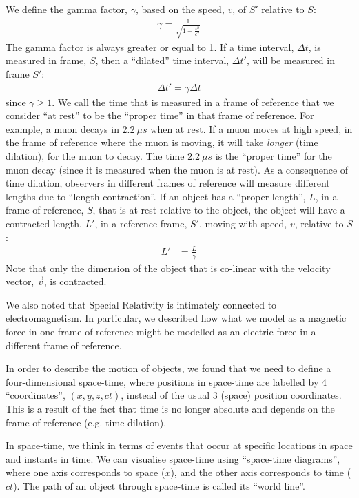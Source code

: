 \begin{chapterSummary}
We define the gamma factor, $\gamma$, based on the speed, $v$, of $S'$ relative to $S$:
\begin{align*}
\gamma = \frac{1}{\sqrt{1-\frac{v^2}{c^2}}}
\end{align*}
The gamma factor is always greater or equal to 1. If a time interval, $\Delta t$, is measured in frame, $S$, then a ``dilated'' time interval, $\Delta t'$, will be measured in frame $S'$:
\begin{align*}
\Delta t'=\gamma \Delta t
\end{align*}
since $\gamma \geq 1$. We call the time that is measured in a frame of reference that we consider ``at rest'' to be the ``proper time'' in that frame of reference. For example, a muon decays in $\SI{2.2}{\mu s}$ when at rest. If a muon moves at high speed, in the frame of reference where the muon is moving, it will take \textit{longer} (time dilation), for the muon to decay. The time $\SI{2.2}{\mu s}$ is the ``proper time'' for the muon decay (since it is measured when the muon is at rest). As a consequence of time dilation, observers in different frames of reference will measure different lengths due to ``length contraction''. If an object has a ``proper length'', $L$, in a frame of reference, $S$, that is at rest relative to the object, the object will have a contracted length, $L'$, in a reference frame, $S'$, moving with speed, $v$, relative to $S$:
\begin{align*}
L'&=\frac{L}{\gamma}
\end{align*} 
Note that only the dimension of the object that is co-linear with the velocity vector, $\vec v$, is contracted. 

We also noted that Special Relativity is intimately connected to electromagnetism. In particular, we described how what we model as a magnetic force in one frame of reference might be modelled as an electric force in a different frame of reference.

In order to describe the motion of objects, we found that we need to define a four-dimensional space-time, where positions in space-time are labelled by 4 ``coordinates'', $(x,y,z,ct)$, instead of the usual 3 (space) position coordinates. This is a result of the fact that time is no longer absolute and depends on the frame of reference (e.g. time dilation). 

In space-time, we think in terms of events that occur at specific locations in space and instants in time. We can visualise space-time using ``space-time diagrams'', where one axis corresponds to space ($x$), and the other axis corresponds to time ($ct$). The path of an object through space-time is called its ``world line''. 


\end{chapterSummary}
